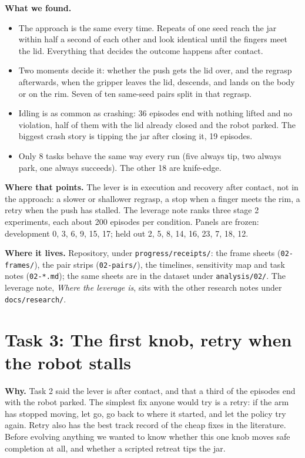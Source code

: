 \documentclass[11pt,a4paper]{article}
\begin{document}
\textbf{What we found.}
\begin{itemize}\setlength\itemsep{1pt}
  \item The approach is the same every time. Repeats of one seed reach the jar within half a second of each other and look identical until the fingers meet the lid. Everything that decides the outcome happens after contact.
  \item Two moments decide it: whether the push gets the lid over, and the regrasp afterwards, when the gripper leaves the lid, descends, and lands on the body or on the rim. Seven of ten same-seed pairs split in that regrasp.
  \item Idling is as common as crashing: 36 episodes end with nothing lifted and no violation, half of them with the lid already closed and the robot parked. The biggest crash story is tipping the jar after closing it, 19 episodes.
  \item Only 8 tasks behave the same way every run (five always tip, two always park, one always succeeds). The other 18 are knife-edge.
\end{itemize}

\textbf{Where that points.} The lever is in execution and recovery after contact, not in the approach: a slower or shallower regrasp, a stop when a finger meets the rim, a retry when the push has stalled. The leverage note ranks three stage 2 experiments, each about 200 episodes per condition. Panels are frozen: development 0, 3, 6, 9, 15, 17; held out 2, 5, 8, 14, 16, 23, 7, 18, 12.

\textbf{Where it lives.} Repository, under \texttt{progress/receipts/}: the frame sheets (\texttt{02-frames/}), the pair strips (\texttt{02-pairs/}), the timelines, sensitivity map and task notes (\texttt{02-*.md}); the same sheets are in the dataset under \texttt{analysis/02/}. The leverage note, \emph{Where the leverage is}, sits with the other research notes under \texttt{docs/research/}.
\newpage
\section*{Task 3: The first knob, retry when the robot stalls}

\textbf{Why.} Task 2 said the lever is after contact, and that a third of the episodes end with the robot parked. The simplest fix anyone would try is a retry: if the arm has stopped moving, let go, go back to where it started, and let the policy try again. Retry also has the best track record of the cheap fixes in the literature. Before evolving anything we wanted to know whether this one knob moves safe completion at all, and whether a scripted retreat tips the jar.
\end{document}
